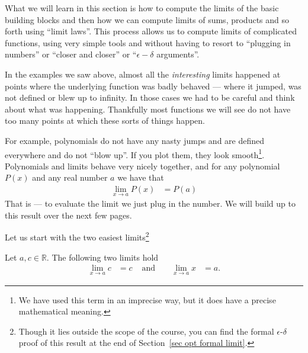 What we will learn in this section is how to compute the limits of the basic
building blocks and then how we can compute limits of sums, products and so
forth using ``limit laws''. This process allows us to compute limits of
complicated functions, using very simple tools and without having to resort to
``plugging in numbers'' or ``closer and closer'' or ``$\epsilon-\delta$
arguments''.


In the examples we saw above, almost all the \emph{interesting} limits happened
at points where the underlying function was badly behaved --- where it jumped,
was not defined or blew up to infinity. In those cases we had to be careful and
think about what was happening. Thankfully most functions we will see do not
have too many points at which these sorts of things happen.

For example, polynomials do not have any nasty jumps and are defined everywhere
and do not ``blow up''. If you plot them, they look smooth\footnote{We have
used this term in an imprecise way, but it does have a precise
mathematical meaning.}. Polynomials and limits behave very nicely together,
and for any polynomial $P(x)$ and any real number $a$ we have that
\begin{align*}
  \lim_{x \to a} P(x) &= P(a)
\end{align*}
That is --- to evaluate the limit we just plug in the number. We will build up
to this result over the next few pages.

Let us start with the two easiest limits\footnote{Though it lies outside the
scope of the course, you can find the formal $\epsilon$-$\delta$ proof of this
result at the end of Section~\ref{sec opt formal limit}.}
\begin{theorem}
\label{thm easy lim}
   Let $a,c \in \mathbb{R}$. The following two limits hold
  \begin{align*}
  \lim_{x \to a} c & = c & \text{ and }&&
  \lim_{x \to a} x &= a.
\end{align*}
\end{theorem}

